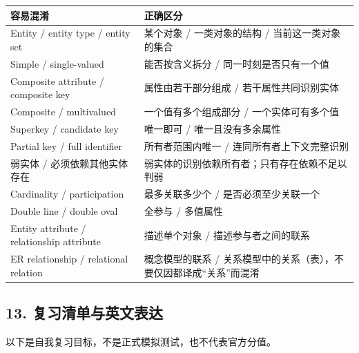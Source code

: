 \begin{longtable}[]{@{}
  >{\raggedright\arraybackslash}p{}
  >{\raggedright\arraybackslash}p{}@{}}
\toprule\noalign{}
\begin{minipage}[b]{\linewidth}\raggedright
容易混淆
\end{minipage} & \begin{minipage}[b]{\linewidth}\raggedright
正确区分
\end{minipage} \\
\midrule\noalign{}
\endhead
\bottomrule\noalign{}
\endlastfoot
Entity / entity type / entity set & 某个对象 / 一类对象的结构 / 当前这一类对象的集合 \\
Simple / single-valued & 能否按含义拆分 / 同一时刻是否只有一个值 \\
Composite attribute / composite key & 属性由若干部分组成 / 若干属性共同识别实体 \\
Composite / multivalued & 一个值有多个组成部分 / 一个实体可有多个值 \\
Superkey / candidate key & 唯一即可 / 唯一且没有多余属性 \\
Partial key / full identifier & 所有者范围内唯一 / 连同所有者上下文完整识别 \\
弱实体 / 必须依赖其他实体存在 & 弱实体的识别依赖所有者；只有存在依赖不足以判弱 \\
Cardinality / participation & 最多关联多少个 / 是否必须至少关联一个 \\
Double line / double oval & 全参与 / 多值属性 \\
Entity attribute / relationship attribute & 描述单个对象 / 描述参与者之间的联系 \\
ER relationship / relational relation & 概念模型的联系 / 关系模型中的关系（表），不要仅因都译成``关系''而混淆 \\
\end{longtable}

\subsection{13. 复习清单与英文表达}\label{02_er_modelling_zh-ux590dux4e60ux6e05ux5355ux4e0eux82f1ux6587ux8868ux8fbe}

以下是自我复习目标，不是正式模拟测试，也不代表官方分值。

